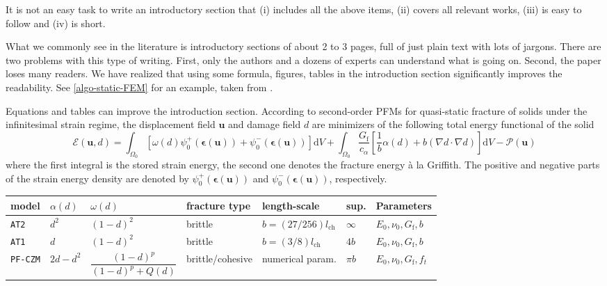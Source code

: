 \documentclass[authoryear,3p,times,preprint,review,fleqn]{elsarticle}
\newcommand{\bfepsilon}{\boldsymbol{\epsilon}}
\newcommand{\bfu}{\boldsymbol{u}}
\newcommand{\td}{\text{d}}
\numberwithin{equation}{section}
\theoremstyle{remark}
\begin{document}
It is not an easy task to write an introductory section that (i) includes all the above items, (ii) covers all relevant works, (iii) is easy to follow and (iv) is short.

What we commonly see in the literature is introductory sections of about 2 to 3 pages, full of just plain text with lots of jargons. There are two problems with this type of writing. First, only the authors and a dozens of experts can understand what is going on. Second, the paper loses many readers. We have realized that using some formula, figures, tables in the introduction section significantly improves the readability.
See \cref{algo-static-FEM} for an example, taken from \cite{Mandal:EFM2019}.

\begin{MyBox}[label={algo-static-FEM}]
{Equations and tables can improve the introduction section.}
According to second-order PFMs for quasi-static fracture of solids under the infinitesimal strain regime, the displacement field $\bfu$ and damage field $d$ are minimizers of the following total energy functional of the solid 
\begin{equation*}
  \mathscr{E} (\bfu, d) 
    = \int_{\varOmega_{0}} \left[\omega(d)\psi_{0}^+(\bfepsilon (\bfu)) + \psi_{0}^-(\bfepsilon (\bfu)) \right]\td V
    + \int_{\varOmega_{0}}  \frac{G_\text{f}}{c_\alpha} \left[ \frac{1}{b} \alpha(d)
    + b \left( \nabla d \cdot \nabla d \right) \right] \td V
    - \mathscr{P} (\bfu)
\label{eq:3}
\end{equation*}
where the first integral is the stored strain energy, the second one denotes the fracture energy \`a la Griffith. The positive and negative parts of the strain energy density are denoted by $\psi_{0}^+(\bfepsilon (\bfu))$ and $\psi_{0}^-(\bfepsilon (\bfu))$, respectively.\\

 \begin{tabularx}{\textwidth}{lllllll}
   \toprule
 model & $\alpha(d)$ &  $\omega(d)$    & fracture type & length-scale & sup.  & Parameters\\
   \midrule     
  \texttt{AT2} & $d^2$  & $(1 - d)^{2}$  & brittle  & $b=(27/256) l_{\text{ch}}$ & $\infty$ & $E_0,\nu_0,G_\text{f},b$ \\
  \texttt{AT1} & $d$    & $(1 - d)^{2}$ &  brittle  & $b=(3/8) l_{\text{ch}}$ & $4b$  & $E_0,\nu_0,G_\text{f},b$\\
  \texttt{PF-CZM} & $2d-d^2$ & $\dfrac{(1 - d)^p}{(1 - d)^p + Q(d)}$ &  brittle/cohesive  & numerical param. & $\pi b$  & $E_0,\nu_0,G_\text{f},f_t$\\
   \bottomrule
 \end{tabularx}%
\end{MyBox}
\end{document}
